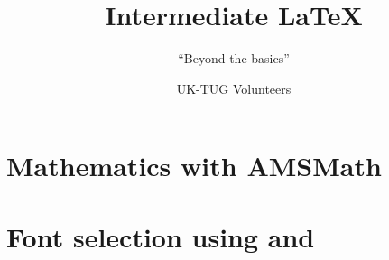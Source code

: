 \usepackage[T1]{fontenc}
\usepackage{babel,booktabs,csquotes,lmodern,tikz,verbatim}

\newcommand*{\BibTeX}{BibTeX}
\newcommand*{\cls}[1]{\textsf{#1}}
\newcommand*{\cs}[1]{\texttt{\char`\\#1}}
\newcommand*{\marg}[1]{\texttt{\char`\{#1\char`\}}}
\newcommand*{\meta}[1]{\ensuremath{\langle}\emph{#1}\ensuremath{\rangle}}
\newcommand*{\oarg}[1]{\texttt{[#1]}}
\newcommand*{\pkg}[1]{\textsf{#1}}

\renewcommand*{\LaTeX}{LaTeX}
\renewcommand*{\LaTeXe}{LaTeX2e}
\renewcommand*{\TeX}{TeX}

\title{Intermediate \LaTeX{}}
\subtitle{\enquote{Beyond the basics}}
\author{UK-TUG Volunteers}
\date{}



\begin{frame}
  \titlepage
\end{frame}



\section{Mathematics with AMSMath}

\section{Font selection using \XeTeX{} and \LuaTeX{}}

